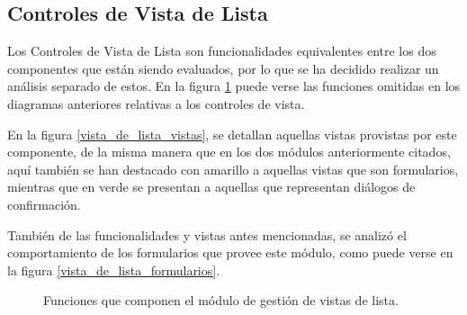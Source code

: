 \subsection{Controles de Vista de Lista}
Los Controles de Vista de Lista son funcionalidades equivalentes entre los 
dos componentes que están siendo evaluados, por lo que se ha decidido realizar
un análisis separado de estos. En la figura \ref{vista_de_lista} puede verse
las funciones omitidas en los diagramas anteriores relativas a los controles de
vista.

En la figura \ref{vista_de_lista_vistas}, se detallan aquellas vistas
provistas por este componente, de la misma manera que en los dos módulos
anteriormente citados, aquí también se han destacado con amarillo a
aquellas vistas que son formularios, mientras que en verde se presentan a
aquellas que representan diálogos de confirmación.

También de las funcionalidades y vistas antes mencionadas, se analizó el
comportamiento de los formularios que provee este módulo, como puede verse en la
figura \ref{vista_de_lista_formularios}.

\begin{figure}[H]
\centering
{}
\caption{Funciones que componen el módulo de gestión de vistas de lista.}
\label{vista_de_lista}
\end{figure}

